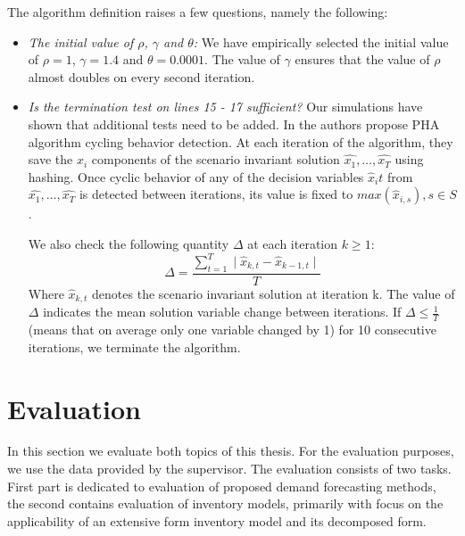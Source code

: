 \documentclass[11pt,a4paper]{article}
\begin{document}
The algorithm definition raises a few questions, namely the following: 
\begin{itemize}
\item \textit{The initial value of $\rho$, $\gamma$ and $\theta$:} We have empirically selected the initial value of $\rho = 1$, $\gamma = 1.4$ and $\theta = 0.0001$. The value of $\gamma$ ensures that the value of $\rho$ almost doubles on every second iteration.
\item \textit{Is the termination test on lines 15 - 17 sufficient?} Our simulations have shown that additional tests need to be added. In \cite{watson2008progressive} the authors propose PHA algorithm cycling behavior detection. At each iteration of the algorithm, they save the $x_i$ components of the scenario invariant solution $\widehat{x_1}, \dots, \widehat{x_T}$ using hashing. Once cyclic behavior of any of the decision variables $\widehat{x}_it$ from $\widehat{x_1}, \dots, \widehat{x_T}$ is detected between iterations, its value is fixed to  $max(\widehat{x}_{i,s}), s\in S$.

 We also check the following quantity $\Delta$ at each iteration $k \geq 1$:
\begin{equation}
\Delta = \frac{\sum\limits_{t=1}^{T} \mid \widehat{x}_{k,t} - \widehat{x}_{k-1,t}  \mid }{T}
\end{equation}
Where $\widehat{x}_{k,t}$ denotes the scenario invariant solution at iteration k.
The value of $\Delta$ indicates the mean solution variable change between iterations. If $\Delta \leq \frac{1}{T}$ (means that on average only one variable changed by 1) for 10 consecutive iterations, we terminate the algorithm.

\end{itemize}

\newpage
\section{Evaluation}
\label{sec:eval}
In this section we evaluate both topics of this thesis. For the evaluation purposes, we use the data provided by the supervisor. The evaluation consists of two tasks. First part is dedicated to evaluation of proposed demand forecasting methods, the second contains evaluation of inventory models, primarily with focus on the applicability of an extensive form inventory model and its decomposed form. 
\end{document}
